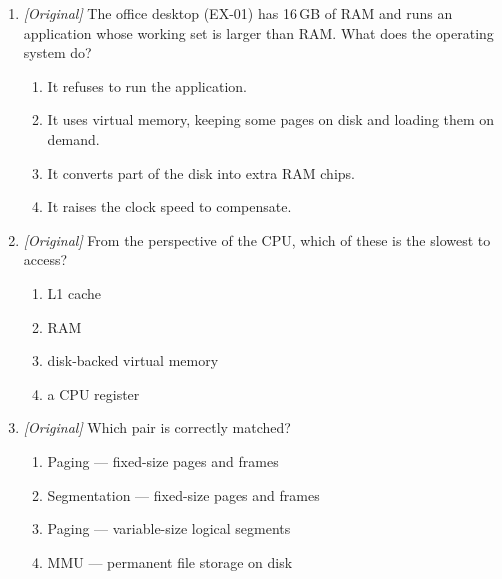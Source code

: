 \documentclass[11pt]{article}
\begin{document}
\begin{enumerate}[label=\textbf{Q\arabic*.}, leftmargin=*]
\begin{enumerate}[label=\Alph*.]
    \item Cache is small, fast memory close to the CPU; virtual memory uses
      slower, disk-backed storage.
    \item Both cache and virtual memory are forms of secondary storage.
    \item Cache extends RAM using disk; virtual memory speeds up the CPU.
  \end{enumerate}
\item \textit{[Original]} The office desktop (EX-01) has 16\,GB of RAM and
  runs an application whose working set is larger than RAM. What does the
  operating system do?
  \begin{enumerate}[label=\Alph*.]
    \item It refuses to run the application.
    \item It uses virtual memory, keeping some pages on disk and loading them
      on demand.
    \item It converts part of the disk into extra RAM chips.
    \item It raises the clock speed to compensate.
  \end{enumerate}
\item \textit{[Original]} From the perspective of the CPU, which of these is
  the slowest to access?
  \begin{enumerate}[label=\Alph*.]
    \item L1 cache
    \item RAM
    \item disk-backed virtual memory
    \item a CPU register
  \end{enumerate}
\item \textit{[Original]} Which pair is correctly matched?
  \begin{enumerate}[label=\Alph*.]
    \item Paging --- fixed-size pages and frames
    \item Segmentation --- fixed-size pages and frames
    \item Paging --- variable-size logical segments
    \item MMU --- permanent file storage on disk
  \end{enumerate}


\end{enumerate}
\end{document}

